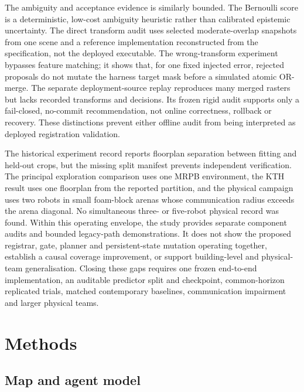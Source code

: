 \documentclass[11pt]{article}
\begin{document}
The ambiguity and acceptance evidence is similarly bounded. The Bernoulli score is a deterministic, low-cost ambiguity heuristic rather than calibrated epistemic uncertainty. The direct transform audit uses selected moderate-overlap snapshots from one scene and a reference implementation reconstructed from the specification, not the deployed executable. The wrong-transform experiment bypasses feature matching; it shows that, for one fixed injected error, rejected proposals do not mutate the harness target mask before a simulated atomic OR-merge. The separate deployment-source replay reproduces many merged rasters but lacks recorded transforms and decisions. Its frozen rigid audit supports only a fail-closed, no-commit recommendation, not online correctness, rollback or recovery. These distinctions prevent either offline audit from being interpreted as deployed registration validation.

The historical experiment record reports floorplan separation between fitting and held-out crops, but the missing split manifest prevents independent verification. The principal exploration comparison uses one MRPB environment, the KTH result uses one floorplan from the reported partition, and the physical campaign uses two robots in small foam-block arenas whose communication radius exceeds the arena diagonal. No simultaneous three- or five-robot physical record was found. Within this operating envelope, the study provides separate component audits and bounded legacy-path demonstrations. It does not show the proposed registrar, gate, planner and persistent-state mutation operating together, establish a causal coverage improvement, or support building-level and physical-team generalisation. Closing these gaps requires one frozen end-to-end implementation, an auditable predictor split and checkpoint, common-horizon replicated trials, matched contemporary baselines, communication impairment and larger physical teams.


\section{Methods} \label{sec:methods}

\subsection{Map and agent model} \label{app:problem}
\end{document}
